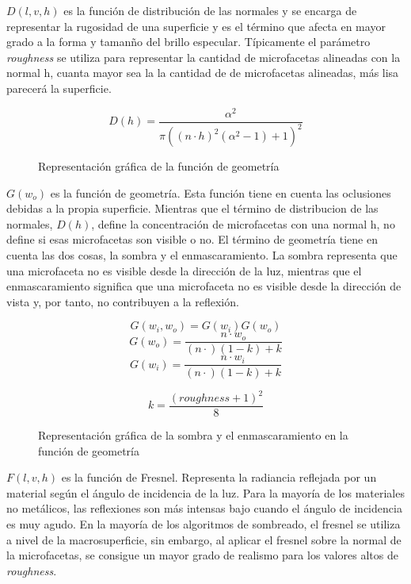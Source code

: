     $D(l, v, h)$  es la funci\'on de distribuci\'on de las normales y se encarga de representar la rugosidad de una superficie
    y es el t\'ermino que afecta en mayor grado a la forma y taman\~no del brillo especular. T\'ipicamente el par\'ametro
    \textit{roughness} se utiliza para representar la cantidad de microfacetas alineadas con la normal h, cuanta mayor sea la
    la cantidad de de microfacetas alineadas, m\'as lisa parecer\'a la superficie.

    $$
    D(h) = \frac{\alpha^2}{\pi((n\cdot{h})^2(\alpha^2 - 1) + 1)^2}
    $$

    \begin{figure}[H]
        \vspace{0.5cm}
        \centering
        \caption{Representaci\'on gr\'afica de la funci\'on de geometr\'ia}
    \end{figure}

    $G(w_o)$ es la funci\'on de geometr\'ia. Esta funci\'on tiene en cuenta las oclusiones debidas a la propia superficie.
    Mientras que el t\'ermino de distribucion de las normales, $D(h)$, define la concentraci\'on de microfacetas con una normal h,
    no define si esas microfacetas son visible o no. El t\'ermino de geometr\'ia tiene en cuenta las dos cosas, la sombra
    y el enmascaramiento. La sombra representa que una microfaceta no es visible desde la direcci\'on de la luz, mientras que el
    enmascaramiento significa que una microfaceta no es visible desde la direcci\'on de vista y, por tanto, no contribuyen
    a la reflexi\'on.

    $$
    G(w_i, w_o) = G(w_i)G(w_o)
    $$
    \singlespacing
    $$
    G(w_o) = \frac{n\cdot{w_o}}{(n\cdot) (1 - k) + k}
    $$
    \singlespacing
    $$
    G(w_i) = \frac{n\cdot{w_i}}{(n\cdot) (1 - k) + k}
    $$
    \singlespacing

    \begin{equation}
    k = \frac{(roughness + 1)^2}{8}
    \end{equation}

    \begin{figure}[H]
        \vspace{0.5cm}
        \centering
        \caption{Representaci\'on gr\'afica de la sombra y el enmascaramiento en la funci\'on de geometr\'ia}
    \end{figure}

    $F(l, v, h)$ es la funci\'on de Fresnel. Representa la radiancia reflejada por un material seg\'un el \'angulo de incidencia
    de la luz. Para la mayor\'ia de los materiales no met\'alicos, las reflexiones son m\'as intensas bajo cuando el \'angulo
    de incidencia es muy agudo. En la mayor\'ia de los algoritmos de sombreado, el fresnel se utiliza a nivel de la macrosuperficie,
    sin embargo, al aplicar el fresnel sobre la normal de la microfacetas, se consigue un mayor grado de realismo para los valores
    altos de \textit{roughness}.

